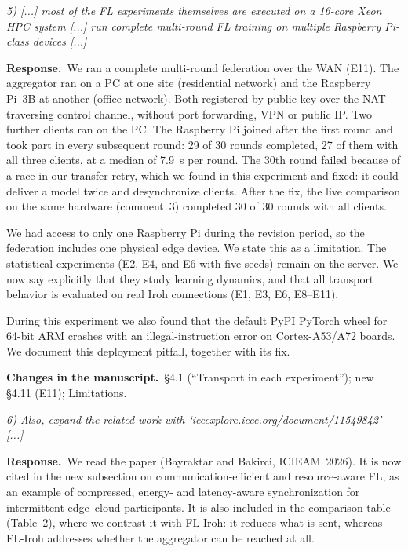 \documentclass[11pt,a4paper]{article}
\newenvironment{comment}{\par\medskip\noindent\begin{minipage}{\linewidth}\color{blue!45!black}\itshape}{\end{minipage}\par}
\newcommand{\reply}{\par\smallskip\noindent\textbf{Response.}~}
\newcommand{\changes}{\par\smallskip\noindent\textbf{Changes in the manuscript.}~}
\begin{document}
\begin{comment}
5) [...] most of the FL experiments themselves are executed on a 16-core Xeon HPC system [...] run complete multi-round FL training on multiple Raspberry Pi-class devices [...]
\end{comment}
\reply We ran a complete multi-round federation over the WAN (E11). The aggregator ran on a PC at one site (residential network) and the Raspberry Pi~3B at another (office network). Both registered by public key over the NAT-traversing control channel, without port forwarding, VPN or public IP. Two further clients ran on the PC. The Raspberry Pi joined after the first round and took part in every subsequent round: 29 of 30 rounds completed, 27 of them with all three clients, at a median of 7.9~s per round. The 30th round failed because of a race in our transfer retry, which we found in this experiment and fixed: it could deliver a model twice and desynchronize clients. After the fix, the live comparison on the same hardware (comment~3) completed 30 of 30 rounds with all clients.

We had access to only one Raspberry Pi during the revision period, so the federation includes one physical edge device. We state this as a limitation. The statistical experiments (E2, E4, and E6 with five seeds) remain on the server. We now say explicitly that they study learning dynamics, and that all transport behavior is evaluated on real Iroh connections (E1, E3, E6, E8--E11).

During this experiment we also found that the default PyPI PyTorch wheel for 64-bit ARM crashes with an illegal-instruction error on Cortex-A53/A72 boards. We document this deployment pitfall, together with its fix.

\changes \S4.1 (``Transport in each experiment''); new \S4.11 (E11); Limitations.

\begin{comment}
6) Also, expand the related work with `ieeexplore.ieee.org/document/11549842' [...]
\end{comment}
\reply We read the paper (Bayraktar and Bakirci, ICIEAM~2026). It is now cited in the new subsection on communication-efficient and resource-aware FL, as an example of compressed, energy- and latency-aware synchronization for intermittent edge--cloud participants. It is also included in the comparison table (Table~2), where we contrast it with FL-Iroh: it reduces what is sent, whereas FL-Iroh addresses whether the aggregator can be reached at all.
\end{document}
